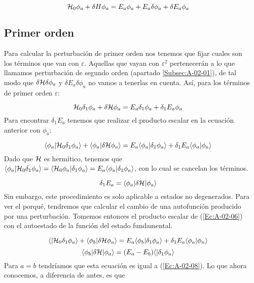 \begin{equation}
    \mathcal{H}_0 \phi_a + \delta H \phi_a = E_a \phi_a + E_a \delta \phi_a + \delta E_a \phi_a 
\end{equation}

\subsection{Primer orden}

Para calcular la perturbación de primer orden nos tenemos que fijar cuales son los términos que van con $\varepsilon$. Aquellas que vayan con $\varepsilon^2$ pertenecerán a lo que llamamos perturbación de segundo orden (apartado \ref{Subsec:A-02-01}), de tal modo que $\delta\mathcal{H}\delta\phi_a$ y $\delta E_a\delta\phi_a$ no vamos a tenerlas en cuenta. Así, para los términos de primer orden $\varepsilon$:

\begin{equation}
    \mathcal{H}_0 \delta_1 \phi_a + \delta \mathcal{H} \phi_a = E_a \delta_1 \phi_a + \delta_1 E_a \phi_a \label{Ec:A-02-06}
\end{equation}
Para encontrar $\delta_1 E_a$ tenemos que realizar el producto escalar en la ecuación anterior con $\phi_a$:

\begin{equation}
    \langle \phi_a | \mathcal{H}_0 \delta_1 \phi_a \rangle + \langle \phi_a | \delta \mathcal{H} \phi_a \rangle = E_a \langle \phi_a |\delta_1 \phi_a \rangle + \delta_1 E_a \langle \phi_a |\phi_a \rangle
\end{equation}
Dado que $\mathcal{H}$ es hermítico, tenemos que $\langle \phi_a |\mathcal{H}_0 \delta_1 \phi_a\rangle = \langle \mathcal{H}_0 \phi_a |\delta_1 \phi_a\rangle = E_a \langle \phi_a |\delta_1 \phi_a \rangle $, con lo cual se cancelan los términos.

\begin{equation}
    \delta_1 E_a = \langle \phi_a |\delta \mathcal{H} |\phi_a\rangle  \label{Ec:A-02-08}
\end{equation}
Sin embargo, este procedimiento es solo aplicable a estados no degenerados. Para ver el porqué, tendremos que calcular el cambio de una autofunción producido por una perturbación. Tomemos entonces el producto escalar de (\ref{Ec:A-02-06}) con el autoestado de la función del estado fundamental.

\begin{equation*}
    \langle |\mathcal{H}_0 \delta_1 \phi_a \rangle + \langle \phi_b | \delta \mathcal{H} \phi_a\rangle = E_a \langle \phi_b |\delta_1 \phi_a \rangle + \delta_1 E_a \langle \phi_a | \phi_n \rangle
\end{equation*}
\begin{equation}
\langle \phi_b |\delta \mathcal{H} |\phi_a \rangle = (E_a - E_b) \langle |\delta_1 \phi_a\rangle
\end{equation}
Para $a=b$ tendríamos que esta ecuación es igual a (\ref{Ec:A-02-08}). Lo que ahora conocemos, a diferencia de antes, es que

